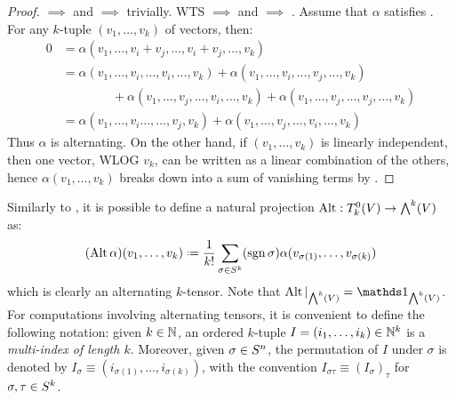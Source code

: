 \begin{proofbox}
  \begin{proof}
     $ \implies $  and  $ \implies $  trivially. WTS  $ \implies $  and  $ \implies $ .
    Assume that $ \alpha $ satisfies . For any $ k $-tuple $ (v_1 , \dots , v_k) $ of vectors, then:
    \begin{equation*}
      \begin{split}
        0
        & = \alpha(v_1 , \dots , v_i + v_j , \dots , v_i + v_j , \dots , v_k) \\
        & = \alpha(v_1 , \dots , v_i , \dots , v_i , \dots , v_k) + \alpha(v_1 , \dots , v_i , \dots , v_j , \dots , v_k) \\
        & \qquad \qquad + \alpha(v_1 , \dots , v_j , \dots , v_i , \dots , v_k) + \alpha(v_1 , \dots , v_j , \dots , v_j , \dots , v_k) \\
        & = \alpha(v_1 , \dots , v_i \dots , \dots , v_j , v_k) + \alpha(v_1 , \dots , v_j , \dots , v_i , \dots , v_k)
      \end{split}
    \end{equation*}
    Thus $ \alpha $ is alternating. On the other hand, if $ (v_1 , \dots , v_k) $ is linearly independent, then one vector, WLOG $ v_k $, can be written as a linear combination of the others, hence $ \alpha(v_1 , \dots , v_k) $ breaks down into a sum of vanishing terms by .
  \end{proof}
\end{proofbox}

Similarly to , it is possible to define a natural projection $ \operatorname{Alt} : T^0_k(V) \rightarrow {\bigwedge}^{k}(V) $ as:
\begin{equation}
  (\Alt \alpha)(v_1 , \dots , v_k) \defeq \frac{1}{k!} \sum_{\sigma \in \sy{k}} (\sgn \sigma) \alpha(v_{\sigma(1)} , \dots , v_{\sigma(k)})
\end{equation}
which is clearly an alternating $ k $-tensor. Note that $ \Alt \vert_{\lv{k}(V)} = \id_{\lv{k}(V)} $. For computations involving alternating tensors, it is convenient to define the following notation: given $ k \in \mathbb{N} $, an ordered $ k $-tuple $ I = (i_1 , \dots , i_k) \in \mathbb{N}^k $ is a \emph{multi-index of length $ k $}. Moreover, given $ \sigma \in S^{n} $, the permutation of $ I $ under $ \sigma $ is denoted by $ I_\sigma \equiv (i_{\sigma(1)} , \dots , i_{\sigma(k)}) $, with the convention $ I_{\sigma \tau} \equiv (I_\sigma)_\tau $ for $ \sigma , \tau \in S^{k} $.

